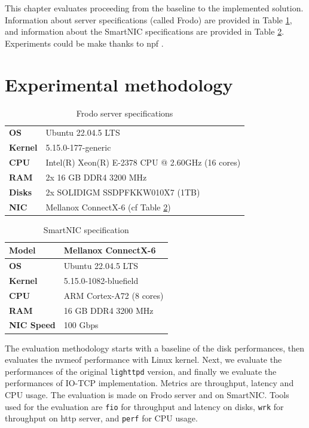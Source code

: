This chapter evaluates proceeding from the baseline to the implemented solution. Information about
server specifications (called Frodo) are provided in Table \ref{table:frodo-specs}, and information about the SmartNIC specifications are provided in Table \ref{table:smartnic-specs}. Experiments could be make thanks to \acrfull{npf} \cite{barbette_tbarbettenpf_2026}.

\section{Experimental methodology}

\begin{table}[htpb]
    \centering
    \caption{Frodo server specifications}
    \label{table:frodo-specs}
    \small
    \begin{tabularx}{\columnwidth}{@{}lX@{}}
    \toprule
    \textbf{OS} & Ubuntu 22.04.5 LTS \\
    \textbf{Kernel} & 5.15.0-177-generic \\
    \textbf{CPU} & Intel(R) Xeon(R) E-2378 CPU @ 2.60GHz (16 cores) \\
    \textbf{RAM} & 2x 16 GB  DDR4 3200 MHz \\
    \textbf{Disks} & 2x SOLIDIGM SSDPFKKW010X7 (1TB) \\
    \textbf{NIC} & Mellanox ConnectX-6 (cf Table \ref{table:smartnic-specs}) \\
    \bottomrule
    \end{tabularx}
\end{table}

\begin{table}[htbp]
    \centering
    \caption{SmartNIC specification}
    \label{table:smartnic-specs}
    \begin{tabular}{@{}ll@{}}
        \toprule
        \textbf{Model} & Mellanox ConnectX-6 \\
        \midrule
        \textbf{OS} & Ubuntu 22.04.5 LTS \\
        \textbf{Kernel} & 5.15.0-1082-bluefield \\
        \textbf{CPU} & ARM Cortex-A72 (8 cores) \\
        \textbf{RAM} & 16 GB  DDR4 3200 MHz \\
        \textbf{NIC Speed} & 100 Gbps \\
        \bottomrule
    \end{tabular}
\end{table}

The evaluation methodology starts with a baseline of the disk performances, then evaluates the \acrshort{nvmeof} performance with Linux kernel. Next, we evaluate the performances of the original \texttt{lighttpd} version, and finally we evaluate the performances of IO-TCP implementation. Metrics are throughput, latency and CPU usage. The evaluation is made on Frodo server and on SmartNIC. Tools used for the evaluation are \texttt{\acrfull{fio}} \cite{noauthor_kernelgitaxboefiogit_nodate} for throughput and latency on disks, \texttt{wrk} \cite{glozer_wgwrk_2026} for throughput on \acrshort{http} server, and \texttt{perf} \cite{linux_perf,perfwiki} for CPU usage. 

